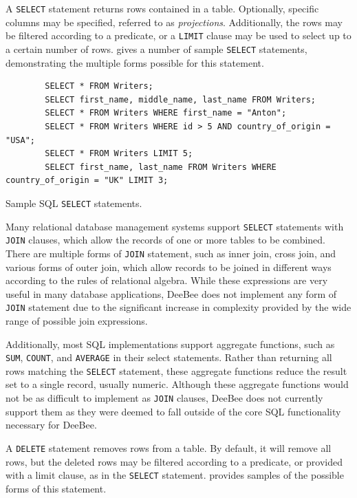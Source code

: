 A \texttt{SELECT} statement returns rows contained in a table. Optionally, specific columns may be specified, referred to as \textit{projections}. Additionally, the rows may be filtered according to a predicate, or a \texttt{LIMIT} clause may be used to select up to a certain number of rows.  gives a number of sample \texttt{SELECT} statements, demonstrating the multiple forms possible for this statement. 

\begin{listing}[h]
    \begin{verbatim}
        SELECT * FROM Writers;
        SELECT first_name, middle_name, last_name FROM Writers; 
        SELECT * FROM Writers WHERE first_name = "Anton"; 
        SELECT * FROM Writers WHERE id > 5 AND country_of_origin = "USA"; 
        SELECT * FROM Writers LIMIT 5; 
        SELECT first_name, last_name FROM Writers WHERE country_of_origin = "UK" LIMIT 3; 
    \end{verbatim}
    \caption{Sample SQL \texttt{SELECT} statements.}
    \label{lst:select}
\end{listing}

Many relational database management systems support \texttt{SELECT} statements with \texttt{JOIN} clauses, which allow the records of one or more tables to be combined. There are multiple forms of \texttt{JOIN} statement, such as inner join, cross join, and various forms of outer join, which allow records to be joined in different ways according to the rules of relational algebra. While these expressions are very useful in many database applications, DeeBee does not implement any form of \texttt{JOIN} statement due to the significant increase in complexity provided by the wide range of possible join expressions.

Additionally, most SQL implementations support aggregate functions, such as \texttt{SUM}, \texttt{COUNT}, and \texttt{AVERAGE} in their select statements. Rather than returning all rows matching the \texttt{SELECT} statement, these aggregate functions reduce the result set to a single record, usually numeric. Although these aggregate functions would not be as difficult to implement as \texttt{JOIN} clauses, DeeBee does not currently support them as they were deemed to fall outside of the core SQL functionality necessary for DeeBee.

A \texttt{DELETE} statement removes rows from a table. By default, it will remove all rows, but the deleted rows may be filtered according to a predicate, or provided with a limit clause, as in the \texttt{SELECT} statement.  provides samples of the possible forms of this statement.

